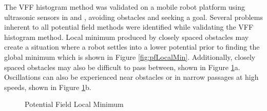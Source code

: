 \documentclass[numbered,pdftex]{ohio-etd}
\begin{document}
The VFF histogram method was validated on a mobile robot platform using ultrasonic sensors in \cite{borenstein_real-time_1990} and \cite{borenstein_vector_1991}, avoiding obstacles and seeking a goal. Several problems inherent to all potential field methods were identified while validating the VFF histogram method. Local minimum produced by closely spaced obstacles may create a situation where a robot settles into a lower potential prior to finding the global minimum which is shown in Figure \ref{fig:pfLocalMin}. Additionally, closely spaced obstacles may also be difficult to pass between, shown in Figure \ref{fig:vff}a. Oscillations can also be experienced near obstacles or in narrow passages at high speeds, shown in Figure \ref{fig:vff}b. 

\begin{figure}[H]
	\begin{subfigmatrix}{2}%
		\centering
	\end{subfigmatrix}
	\caption{Potential Field Local Minimum \cite{liu_virtual-waypoint_2016}}
	\label{fig:vff}
\end{figure}
\end{document}
